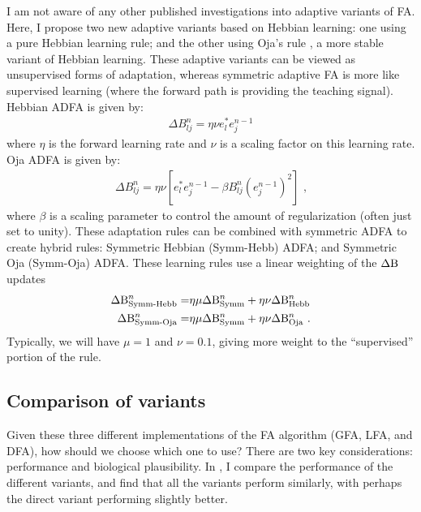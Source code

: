 I am not aware of any other published investigations
into adaptive variants of FA.
Here, I propose two new adaptive variants based on Hebbian learning:
one using a pure Hebbian learning rule;
and the other using Oja's rule \parencite{Oja1982},
a more stable variant of Hebbian learning.
These adaptive variants can be viewed as unsupervised forms of adaptation,
whereas symmetric adaptive FA is more like supervised learning
(where the forward path is providing the teaching signal).
Hebbian ADFA is given by:
\begin{align}
  \Delta B^n_{lj} = \eta\nu e^*_l e^{n-1}_j
\end{align}
where $\eta$ is the forward learning rate
and $\nu$ is a scaling factor on this learning rate.
Oja ADFA is given by:
\begin{align}
  \Delta B^n_{lj} = \eta\nu \left[
    e^*_l e^{n-1}_j - \beta B^n_{lj} \left(e^{n-1}_j\right)^2 \right]\text{ ,}
\end{align}
where $\beta$ is a scaling parameter
to control the amount of regularization (often just set to unity).
These adaptation rules can be combined with symmetric ADFA
to create hybrid rules:
Symmetric Hebbian (Symm-Hebb) ADFA;
and Symmetric Oja (Symm-Oja) ADFA.
These learning rules use a linear weighting of the $\Delta\mathrm{B}$ updates
\begin{align}
  \Delta\mathrm{B}^n_\text{Symm-Hebb} = &
    \eta\mu \Delta\mathrm{B}^n_\text{Symm} + \eta\nu \Delta\mathrm{B}^n_\text{Hebb} \\
  \Delta\mathrm{B}^n_\text{Symm-Oja} = &
    \eta\mu \Delta\mathrm{B}^n_\text{Symm} + \eta\nu \Delta\mathrm{B}^n_\text{Oja} \text{ .}
\end{align}
Typically, we will have $\mu = 1$ and $\nu = 0.1$,
giving more weight to the ``supervised'' portion of the rule.


\subsection{Comparison of variants}

Given these three different implementations of the FA algorithm
(GFA, LFA, and DFA),
how should we choose which one to use?
There are two key considerations: performance and biological plausibility.
In ,
I compare the performance of the different variants,
and find that all the variants perform similarly,
with perhaps the direct variant performing slightly better.

